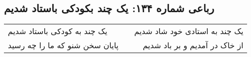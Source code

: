 \begin{center}
\section*{رباعی شماره ۱۳۴: یک چند بکودکی باستاد شدیم}
\label{sec:sh134}
\begin{longtable}{l p{0.5cm} r}
یک چند به کودکی باستاد شدیم
&&
یک چند به استادی خود شاد شدیم
\\
پایان سخن شنو که ما را چه رسید
&&
از خاک در آمدیم و بر باد شدیم
\\
\end{longtable}
\end{center}
